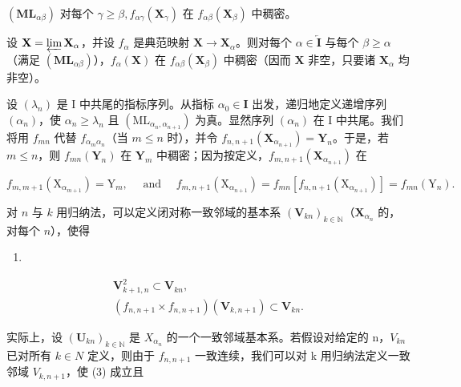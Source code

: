 \((\mathbf{ML}_{\alpha \beta})\) 对每个 \(\gamma \geqslant \beta, f_{\alpha \gamma}(\mathbf{X}_{\gamma})\) 在 \(f_{\alpha \beta}(\mathbf{X}_{\beta})\) 中稠密。

设 \(\mathbf{X} = \varprojlim \mathbf{X}_{\alpha}\)，并设 \(f_{\alpha}\) 是典范映射 \(\mathbf{X} \to \mathbf{X}_{\alpha}\)。则对每个 \(\alpha \in \overleftarrow{\mathbf{I}}\) 与每个 \(\beta \geqslant \alpha\)（满足 \((\mathbf{ML}_{\alpha\beta})\)），\(f_{\alpha}(\mathbf{X})\) 在 \(f_{\alpha\beta}(\mathbf{X}_{\beta})\) 中稠密（因而 \(\mathbf{X}\) 非空，只要诸 \(\mathbf{X}_{\alpha}\) 均非空）。

设 \((\lambda_{n})\) 是 I 中共尾的指标序列。从指标 \(\alpha_0 \in \mathbf{I}\) 出发，递归地定义递增序列 \((\alpha_{n})\)，使 \(\alpha_{n} \geqslant \lambda_{n}\) 且 \((\mathrm{ML}_{\alpha_{n}, \alpha_{n+1}})\) 为真。显然序列 \((\alpha_{n})\) 在 I 中共尾。我们将用 \(f_{mn}\) 代替 \(f_{\alpha_m\alpha_n}\)（当 \(m \leqslant n\) 时），并令 \(f_{n,n+1}(\mathbf{X}_{\alpha_{n+1}}) = \mathbf{Y}_n\)。于是，若 \(m \leqslant n\)，则 \(f_{mn}(\mathbf{Y}_n)\) 在 \(\mathbf{Y}_m\) 中稠密；因为按定义，\(f_{m,n+1}(\mathbf{X}_{\alpha_{n+1}})\) 在

\[
f _ {m, m + 1} \left(\mathrm{X} _ {\alpha_ {m + 1}}\right) = \mathrm{Y} _ {m}, \quad \text { and } \quad f _ {m, n + 1} \left(\mathrm{X} _ {\alpha_ {n + 1}}\right) = f _ {m n} \left[ f _ {n, n + 1} \left(\mathrm{X} _ {\alpha_ {n + 1}}\right) \right] = f _ {m n} \left(\mathrm{Y} _ {n}\right).
\]

对 \(n\) 与 \(k\) 用归纳法，可以定义闭对称一致邻域的基本系 \((\mathbf{V}_{kn})_{k\in \mathbb{N}}\)（\(\mathbf{X}_{\alpha_n}\) 的，对每个 \(n\)），使得

\begin{enumerate}
\def\labelenumi{(\arabic{enumi})}
\setcounter{enumi}{1}
\tightlist
\item
\end{enumerate}

\[
\begin{array}{c} \mathbf {V} _ {k + 1, n} ^ {2} \subset \mathbf {V} _ {k n}, \\ (f _ {n, n + 1} \times f _ {n, n + 1}) (\mathbf {V} _ {k, n + 1}) \subset \mathbf {V} _ {k n}. \end{array}\tag{3}
\]

实际上，设 \((\mathbf{U}_{kn})_{k\in\mathbb{N}}\) 是 \(X_{\alpha_{n}}\) 的一个一致邻域基本系。若假设对给定的 n，\(V_{kn}\) 已对所有 \(k\in N\) 定义，则由于 \(f_{n,n+1}\) 一致连续，我们可以对 k 用归纳法定义一致邻域 \(V_{k,n+1}\)，使 (3) 成立且

